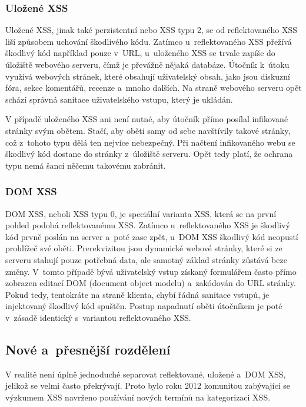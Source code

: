 \documentclass[11pt, conference, a4paper]{IEEEtran}
\begin{document}
\subsubsection{Uložené XSS}
Uložené XSS, jinak také perzistentní nebo XSS typu 2, se od reflektovaného XSS liší způsobem uchování škodlivého kódu. Zatímco u~reflektovaného XSS přežívá škodlivý kód například pouze v~URL, u~uloženého XSS se trvale zapíše do úložiště webového serveru, čímž je převážně nějaká databáze. Útočník k~útoku využívá webových stránek, které obsahují uživatelský obsah, jako jsou diskuzní fóra, sekce komentářů, recenze a~mnoho dalších. Na straně webového serveru opět schází správná sanitace uživatelského vstupu, který je ukládán. 

V případě uloženého XSS ani není nutné, aby útočník přímo posílal infikované stránky svým obětem. Stačí, aby oběti samy od sebe navštívily takové stránky, což z~tohoto typu dělá ten nejvíce nebezpečný. Při načtení infikovaného webu se škodlivý kód dostane do stránky z~úložiště serveru. Opět tedy platí, že ochrana typu  nemá šanci něčemu takovému zabránit.~\cite{XSS-owasp}

\subsubsection{DOM XSS}
DOM XSS, neboli XSS typu 0, je speciální varianta XSS, která se na první pohled podobá reflektovanému XSS. Zatímco u~reflektovaného XSS je škodlivý kód prvně poslán na server a~poté zase zpět, u~DOM XSS škodlivý kód neopustí prohlížeč své oběti. Prerekvizitou jsou dynamické webové stránky, které si ze serveru stahují pouze potřebná data, ale samotný základ stránky zůstává beze změny. V~tomto případě bývá uživatelský vstup získaný formulářem často přímo zobrazen editací DOM (document object modelu) a~zakódován do URL stránky. Pokud tedy, tentokráte na straně klienta, chybí řádná sanitace vstupů, je injektovaný škodlivý kód spuštěn. Postup napadnutí oběti útočníkem je poté v~zásadě identický s~variantou reflektovaného XSS.~\cite{DOM-XSS-owasp}

\subsection{Nové a~přesnější rozdělení}
V realitě není úplně jednoduché separovat reflektované, uložené a~DOM XSS, jelikož se velmi často překrývají. Proto bylo roku 2012 komunitou zabývající se výzkumem XSS navrženo používání nových termínů na kategorizaci XSS.
\end{document}
